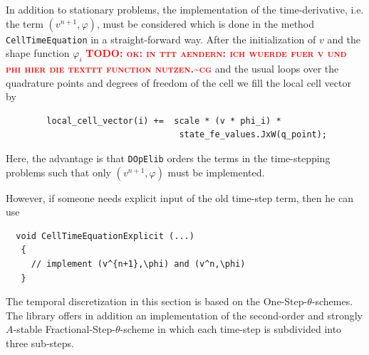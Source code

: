 \documentclass[prodmode,acmtoms]{acmsmall}
\numberwithin{equation}{section}
\renewcommand{\phi}{\varphi}
\newcommand{\dope}{\texttt{DOpElib}}
\newcommand{\todocg}[1]{\textbf{\textsc{\textcolor{red}{TODO: #1\textasciitilde cg}}}}
\begin{document}
In addition to stationary problems, the implementation
of the time-derivative, i.e. the term $ (v^{n+1},\phi)$, must be considered which is done
in the method \texttt{CellTimeEquation} in a straight-forward way. After the
initialization of $v$ and the shape function $\phi_i$ \todocg{ok: in ttt
  aendern: ich wuerde fuer v und phi hier die texttt function nutzen.} and the usual loops over the quadrature points and  degrees of freedom of the cell we fill the local cell vector by
\begin{lstlisting}
        local_cell_vector(i) +=  scale * (v * phi_i) * 
                                  state_fe_values.JxW(q_point);    
\end{lstlisting}
Here, the advantage is that \dope{} orders the terms in the time-stepping
problems
such that only $(v^{n+1},\phi)$ must be implemented. 



\begin{remark}
However, if someone 
needs explicit input of the old time-step term, then he can use 
\begin{lstlisting}
  void CellTimeEquationExplicit (...)
   {
     // implement (v^{n+1},\phi) and (v^n,\phi)  
   }
\end{lstlisting}
\end{remark}

\begin{remark}
The temporal discretization in this section 
is based on the One-Step-$\theta$-schemes. The library
offers in addition an implementation 
of the second-order and strongly $A$-stable 
Fractional-Step-$\theta$-scheme in which 
each time-step is subdivided into three 
sub-steps. 
\end{remark}
\end{document}

